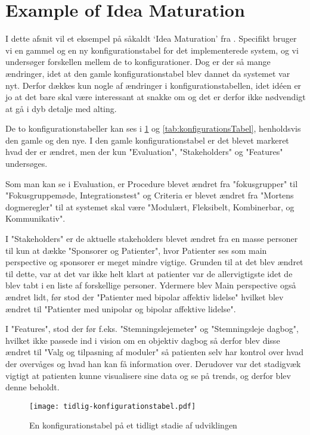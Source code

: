 \section{Example of Idea Maturation}
I dette afsnit vil et eksempel på såkaldt `Idea Maturation' fra \citet[Kapitel 23]{art:essence}.
Specifikt bruger vi en gammel og en ny konfigurationstabel for det implementerede system, og vi undersøger forskellen mellem de to konfigurationer.
Dog er der så mange ændringer, idet at den gamle konfigurationstabel blev dannet da systemet var nyt. 
Derfor dækkes kun nogle af ændringer i konfigurationstabellen, idet idéen er jo at det bare skal være interessant at snakke om og det er derfor ikke nødvendigt at gå i dyb detalje med alting.

De to konfigurationstabeller kan ses i \cref{tab:tidligKonfigurationsTabel} og \cref{tab:konfigurationsTabel}, henholdsvis den gamle og den nye. 
I den gamle konfigurationstabel er det blevet markeret hvad der er ændret, men der kun "Evaluation", "Stakeholders" og "Features" undersøges. 

Som man kan se i Evaluation, er Procedure blevet ændret fra "fokusgrupper" til "Fokusgruppemøde, Integrationstest" og Criteria er blevet ændret fra "Mortens dogmeregler" til at systemet skal være "Modulært, Fleksibelt, Kombinerbar, og Kommunikativ". 

I "Stakeholders" er de aktuelle stakeholders blevet ændret fra en masse personer til kun at dække "Sponsorer og Patienter", hvor Patienter ses som main perspective og sponsorer er meget mindre vigtige. Grunden til at det blev ændret til dette, var at det var ikke helt klart at patienter var de allervigtigste idet de blev tabt i en liste af forskellige personer.
Ydermere blev Main perspective også ændret lidt, før stod der "Patienter med bipolar affektiv lidelse" hvilket blev ændret til "Patienter med unipolar og bipolar affektive lidelse". 

I "Features", stod der før f.eks. "Stemningslejemeter" og "Stemningsleje dagbog", hvilket ikke passede ind i vision om en objektiv dagbog så derfor blev disse ændret til "Valg og tilpasning af moduler" så patienten selv har kontrol over hvad der overvåges og hvad han kan få information over. Derudover var det stadigvæk vigtigt at patienten kunne visualisere sine data og se på trends, og derfor blev denne beholdt. 

\begin{figure}
	\texttt{[image: tidlig-konfigurationstabel.pdf]}
	\caption{En konfigurationstabel på et tidligt stadie af udviklingen}
	\label{tab:tidligKonfigurationsTabel}
\end{figure}